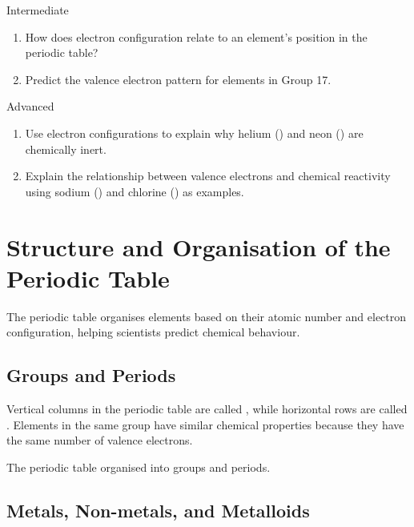 \begin{tieredquestions}{Intermediate}
\begin{enumerate}
	\item How does electron configuration relate to an element's position in the periodic table?
	\item Predict the valence electron pattern for elements in Group 17.
\end{enumerate}
\end{tieredquestions}

\begin{tieredquestions}{Advanced}
\begin{enumerate}
	\item Use electron configurations to explain why helium () and neon () are chemically inert.
	\item Explain the relationship between valence electrons and chemical reactivity using sodium () and chlorine () as examples.
\end{enumerate}
\end{tieredquestions}

\section{Structure and Organisation of the Periodic Table}

The periodic table organises elements based on their atomic number and electron configuration, helping scientists predict chemical behaviour.

\subsection{Groups and Periods}

Vertical columns in the periodic table are called , while horizontal rows are called . Elements in the same group have similar chemical properties because they have the same number of valence electrons.

\begin{marginfigure}
\centering
\caption{The periodic table organised into groups and periods.}
\end{marginfigure}


\subsection{Metals, Non-metals, and Metalloids}

